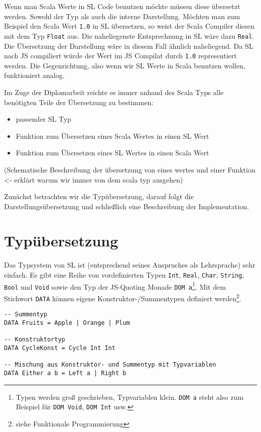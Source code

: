 \documentclass[12pt]{scrreprt}
\begin{document}
Wenn man Scala Werte in \ac{SL} Code benutzen möchte müssen diese übersetzt werden. Sowohl der Typ als auch die interne Darstellung. Möchten man zum Beispiel den Scala Wert \lstinline!1.0! in \ac{SL} übersetzen, so weist der Scala Compiler diesen mit dem Typ \lstinline!Float! aus. Die naheliegenste Entsprechnung in \ac{SL} wäre dazu \lstinline!Real!. Die Übersetzung der Darstellung wäre in diesem Fall ähnlich naheliegend. Da \ac{SL} nach \ac{JS} compiliert würde der Wert im \ac{JS} Compilat durch \lstinline!1.0! representiert werden. Die Gegenrichtung, also wenn wir \ac{SL} Werte in Scala benutzen wollen, funktioniert analog. 

Im Zuge der Diplomarbeit reichte es immer anhand des Scala Typs alle benötigten Teile der Übersetzung zu bestimmen:
\begin{itemize}
\item passender \ac{SL} Typ
\item Funktion zum Übersetzen eines Scala Wertes in einen \ac{SL} Wert
\item Funktion zum Übersetzen eines \ac{SL} Wertes in einen Scala Wert
\end{itemize}

(Schematische Beschreibung der übersetzung von eines wertes und einer Funktion <- erklärt warum wir immer von dem scala typ ausgehen)

Zunächst betrachten wir die Typübersetzung, darauf folgt die Darstellungsübersetzung und schließlich eine Beschreibung der Implementation.

\section{Typübersetzung}

Das Typsystem von \ac{SL} ist (entsprechend seines Anspruches als Lehrsprache) sehr einfach. Es gibt eine Reihe von vordefinierten Typen \lstinline!Int!, \lstinline!Real!, \lstinline!Char!, \lstinline!String!, \lstinline!Bool! und \lstinline!Void! sowie den Typ der \ac{JS}-Quoting Monade \lstinline!DOM a!\footnote{Typen werden groß geschrieben, Typvariablen klein. \lstinline!DOM a! steht also zum Beispiel für \lstinline!DOM Void!, \lstinline!DOM Int! usw.}. Mit dem Stichwort \lstinline!DATA! können eigene Konstruktor-/Summentypen definiert werden\footnote{siehe Funktionale Programmierung}.

\begin{lstlisting}[caption=Beispiele für selbstdefinierte Datentypen in \ac{SL}, label=lst:bsp2]
-- Summentyp
DATA Fruits = Apple | Orange | Plum

-- Konstruktortyp
DATA CycleKonst = Cycle Int Int

-- Mischung aus Konstruktor- und Summentyp mit Typvariablen
DATA Either a b = Left a | Right b
\end{lstlisting}
\end{document}
